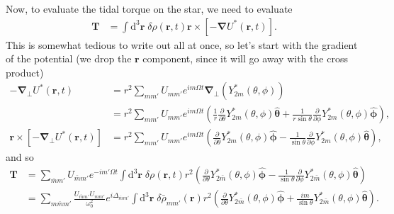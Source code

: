\documentclass[12pt]{article}
\newcommand*{\pd}[2]{\frac{\partial#1}{\partial#2}}
\newcommand*{\bm}[1]{\boldsymbol{\mathbf{#1}}}
\newcommand*{\uv}[1]{\hat{\bm{#1}}}
\newcommand*{\p}[1]{\left(#1\right)}
\newcommand*{\s}[1]{\left[#1\right]}
\begin{document}
Now, to evaluate the tidal torque on the star, we need to evaluate
\begin{align}
    \bm{T}
        &=
            \int\limits\mathrm{d}^3\bm{r}\;
                \delta\rho\p{\bm{r}, t}
                \bm{r} \times \s{-\bm{\nabla} U^*\p{\bm{r}, t}}.
\end{align}
This is somewhat tedious to write out all at once, so let's start with the
gradient of the potential (we drop the $\bm{r}$ component, since it will go away
with the cross product)
\begin{align}
    -\bm{\nabla}_\perp U^*\p{\bm{r}, t}
        &=
            r^2
            \sum\limits_{mm'}
            U_{mm'}
            e^{im\Omega t}
            \bm{\nabla}_{\perp}
            (Y^*_{2m}(\theta, \phi))\nonumber\\
        &=
            r^2
            \sum\limits_{mm'}
            U_{mm'}
            e^{im\Omega t}
            \p{
                \frac{1}{r} \pd{}{\theta}Y^*_{2m}\p{\theta, \phi}\uv{\theta}
                + \frac{1}{r\sin\theta}
                    \pd{}{\phi}Y^*_{2m}\p{\theta, \phi}\uv{\phi}
            },\\
    \bm{r} \times \s{-\bm{\nabla}_\perp U^*\p{\bm{r}, t}}
        &=
            r^2
            \sum\limits_{mm'}
            U_{mm'}
            e^{im\Omega t}
            \p{
                \pd{}{\theta}Y^*_{2m}\p{\theta, \phi}\uv{\phi}
                - \frac{1}{\sin\theta}
                    \pd{}{\phi}Y^*_{2m}\p{\theta, \phi}\uv{\theta}
            },
\end{align}
and so
\begin{align}
    \bm{T}
        &=
            \sum\limits_{\bar{m}m'}
            U_{\bar{m}m'}
            e^{-im'\Omega t}
            \int\limits\mathrm{d}^3\bm{r}\;
                \delta\rho\p{\bm{r}, t}
                r^2
                \p{
                    \pd{}{\theta}Y^*_{2\bar{m}}\p{\theta, \phi}\uv{\phi}
                    - \frac{1}{\sin\theta}
                        \pd{}{\phi}Y^*_{2\bar{m}}\p{\theta, \phi}\uv{\theta}
                }\nonumber\\
        &=
            \sum\limits_{m\bar{m}m'}
            \frac{U_{\bar{m}m'}U_{mm'}}{\omega_0^2}
            e^{i\Delta_{\bar{m}m'}}
            \int\limits\mathrm{d}^3\bm{r}\;
                \delta\bar{\rho}_{mm'}\p{\bm{r}}
                r^2
                \p{
                    \pd{}{\theta}Y^*_{2\bar{m}}\p{\theta, \phi}\uv{\phi}
                    + \frac{im}{\sin\theta}
                        Y^*_{2\bar{m}}\p{\theta, \phi}\uv{\theta}
                }.
\end{align}
\end{document}
